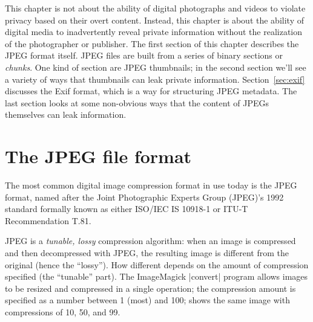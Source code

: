 
This chapter is not about the ability of digital photographs and
videos to violate privacy based on their overt content. Instead, this chapter
is about the ability of digital media to inadvertently reveal
private information without the realization of the photographer or
publisher.  The first section of this chapter describes the JPEG
format itself. JPEG files are built from a series of binary sections
or \emph{chunks}. One kind of section are JPEG thumbnails; in the
second section we'll see a variety of ways that thumbnails can leak
private information. Section~\ref{sec:exif} discusses the Exif format,
which is a way for structuring JPEG metadata. The last section looks
at some non-obvious ways that the content of JPEGs themselves can leak information.

\section{The JPEG file format}

The most common digital image compression format in use today is the
JPEG format, named after the Joint Photographic Experts
Group (JPEG)'s 1992 standard formally known as either ISO/IEC IS 10918-1 or
ITU-T Recommendation T.81.  

JPEG is a \emph{tunable, lossy} compression algorithm: when an image
is compressed and then decompressed with JPEG, the resulting image is
different from the original (hence the ``lossy''). How different depends on the amount of
compression specified (the ``tunable'' part). The ImageMagick |convert| program allows images
to be resized and compressed in a single operation; the compression
amount is specified as a number between 1 (most) and 100;
 shows the same image with compressions of 10, 50,
and 99.

